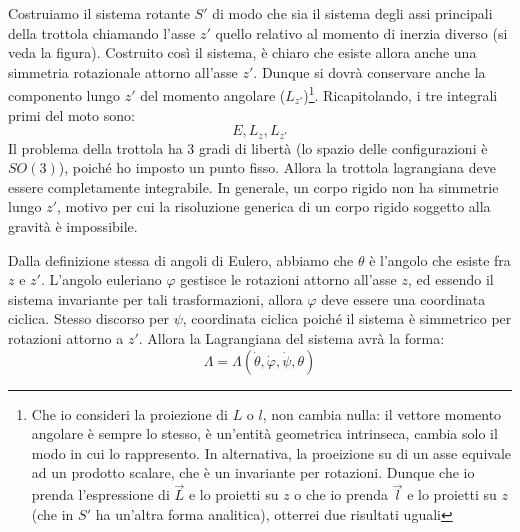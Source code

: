 \documentclass[a4paper,openany]{article}
\begin{document}
	Costruiamo il sistema rotante $S'$ di modo che sia il sistema degli assi principali della trottola chiamando l'asse $z'$ quello relativo al momento di inerzia diverso (si veda la figura). Costruito così il sistema, è chiaro che esiste allora anche una simmetria rotazionale attorno all'asse $z'$. Dunque si dovrà conservare anche la componento lungo $z'$ del momento angolare ($L_{z'}$)\footnote{Che io consideri la proiezione di $L$ o $l$, non cambia nulla: il vettore momento angolare è sempre lo stesso, è un'entità geometrica intrinseca, cambia solo il modo in cui lo rappresento. In alternativa, la proeizione su di un asse equivale ad un prodotto scalare, che è un invariante per rotazioni. Dunque che io prenda l'espressione di $\vec{L}$ e lo proietti su $z$ o che io prenda $\vec{l}$ e lo proietti su $z$ (che in $S'$ ha un'altra forma analitica), otterrei due risultati uguali}. Ricapitolando, i tre integrali primi del moto sono:
	$$
	E, L_{z}, L_{z'}
	$$
	Il problema della trottola ha 3 gradi di libertà (lo spazio delle configurazioni è $SO(3)$), poiché ho imposto un punto fisso. Allora la trottola lagrangiana deve essere completamente integrabile. In generale, un corpo rigido non ha simmetrie lungo $z'$, motivo per cui la risoluzione generica di un corpo rigido soggetto alla gravità è impossibile.
	
	
	Dalla definizione stessa di angoli di Eulero, abbiamo che $\theta$ è l'angolo che esiste fra $z$ e $z'$. L'angolo euleriano $\varphi$ gestisce le rotazioni attorno all'asse $z$, ed essendo il sistema invariante per tali trasformazioni, allora $\varphi$ deve essere una coordinata ciclica. Stesso discorso per $\psi$, coordinata ciclica poiché il sistema è simmetrico per rotazioni attorno a $z'$. Allora la Lagrangiana del sistema avrà la forma:
	\begin{equation}\label{key}
		\Lambda = \Lambda(\dot{\theta},\dot{\varphi},\dot{\psi}, \theta)
	\end{equation}
	
\end{document}

